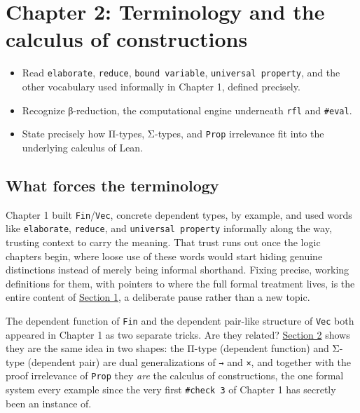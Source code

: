 \chapter{Chapter 2: Terminology and the calculus of constructions}\label{sec:02-terminology-and-coc:00-index:1}

\begin{learningobjectives}
\begin{itemize}
\tightlist
\item
  Read \texttt{elaborate}, \texttt{reduce}, \texttt{bound variable}, \texttt{universal property}, and the other vocabulary used informally in Chapter 1, defined precisely.
\item
  Recognize β-reduction, the computational engine underneath \texttt{rfl} and \texttt{\#eval}.
\item
  State precisely how Π-types, Σ-types, and \texttt{Prop} irrelevance fit into the underlying calculus of Lean.
\end{itemize}
\end{learningobjectives}


\section*{What forces the terminology}\label{sec:02-terminology-and-coc:00-index:2}

Chapter 1 built \texttt{Fin}/\texttt{Vec}, concrete dependent types, by example, and used words like \texttt{elaborate}, \texttt{reduce}, and \texttt{universal property} informally along the way, trusting context to carry the meaning. That trust runs out once the logic chapters begin, where loose use of these words would start hiding genuine distinctions instead of merely being informal shorthand. Fixing precise, working definitions for them, with pointers to where the full formal treatment lives, is the entire content of \hyperref[sec:02-terminology-and-coc:01-terminology:1]{Section 1}, a deliberate pause rather than a new topic.

The dependent function of \texttt{Fin} and the dependent pair-like structure of \texttt{Vec} both appeared in Chapter 1 as two separate tricks. Are they related? \hyperref[sec:02-terminology-and-coc:02-pi-sigma-and-coc:1]{Section 2} shows they are the same idea in two shapes: the Π-type (dependent function) and Σ-type (dependent pair) are dual generalizations of \texttt{→} and \texttt{×}, and together with the proof irrelevance of \texttt{Prop} they \emph{are} the calculus of constructions, the one formal system every example since the very first \texttt{\#check 3} of Chapter 1 has secretly been an instance of.

